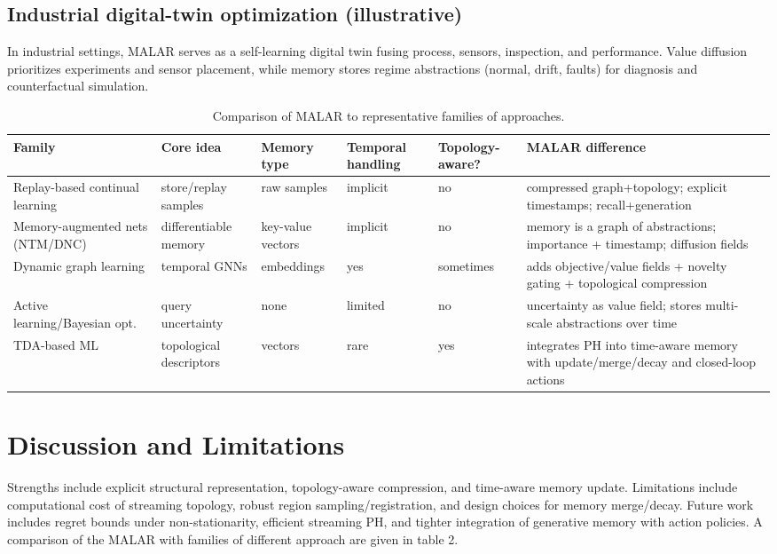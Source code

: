 \documentclass[11pt,english]{article}
\theoremstyle{remark}
\begin{document}
\subsection{Industrial digital-twin optimization (illustrative)}
In industrial settings, MALAR serves as a self-learning digital twin fusing process, sensors, inspection, and performance.
Value diffusion prioritizes experiments and sensor placement, while memory stores regime abstractions (normal, drift, faults)
for diagnosis and counterfactual simulation.


\begin{table}[t]
\centering
\caption{Comparison of MALAR to representative families of approaches.}
\begin{tabular}{p{2.6cm}p{2.6cm}p{2.2cm}p{2.2cm}p{1.6cm}p{3.2cm}}
\toprule
Family & Core idea & Memory type & Temporal handling & Topology-aware? & MALAR difference \\
\midrule
Replay-based continual learning & store/replay samples & raw samples & implicit & no & compressed graph+topology; explicit timestamps; recall+generation \\
Memory-augmented nets (NTM/DNC) & differentiable memory & key-value vectors & implicit & no & memory is a graph of abstractions; importance + timestamp; diffusion fields \\
Dynamic graph learning & temporal GNNs & embeddings & yes & sometimes & adds objective/value fields + novelty gating + topological compression \\
Active learning/Bayesian opt. & query uncertainty & none & limited & no & uncertainty as value field; stores multi-scale abstractions over time \\
TDA-based ML & topological descriptors & vectors & rare & yes & integrates PH into time-aware memory with update/merge/decay and closed-loop actions \\
\bottomrule
\end{tabular}
\end{table}


\section{Discussion and Limitations}
Strengths include explicit structural representation, topology-aware compression, and time-aware memory update.
Limitations include computational cost of streaming topology, robust region sampling/registration, and design choices for memory
merge/decay. Future work includes regret bounds under non-stationarity, efficient streaming PH, and tighter integration of
generative memory with action policies. A comparison of the MALAR with families of different approach are given in table 2.
\end{document}
